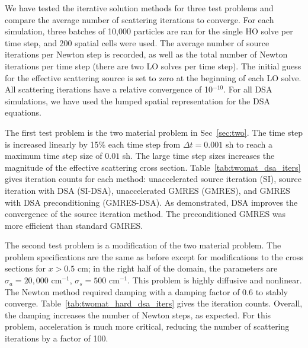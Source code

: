 {We have tested the iterative solution methods for three test problems and compare the average number
of scattering iterations to converge.   For each simulation, three batches of 10,000 particles are ran for 
the single  HO solve per time step, and 200 spatial cells were used.   The average number of source iterations per
Newton step is recorded, as well as the total number of Newton
iterations per time step (there are two LO solves per time step).  The initial guess for
the effective scattering source is set to zero at the beginning of
each LO solve.   All
scattering iterations have a relative convergence of 10$^{-10}$.
For all DSA simulations, we have used the lumped spatial representation for the DSA
equations.

The first test problem is the two material
problem in Sec~\ref{sec:two}.     The time step is increased linearly by 15\% each time step from $\Delta
t=0.001$ sh to reach a maximum time step size of $0.01$ sh.  The large time step sizes
increases the magnitude of the effective scattering cross section.
Table~\ref{tab:twomat_dsa_iters} gives iteration counts for each method: unaccelerated
source iteration (SI), source iteration with DSA (SI-DSA), unaccelerated GMRES (GMRES),
and GMRES with DSA preconditioning (GMRES-DSA).  As demonstrated, DSA improves the
convergence of the source iteration method.  The preconditioned GMRES was more efficient
than standard GMRES.

The second test problem is a modification of the two material problem. The problem
specifications are the same as before except for modifications to the cross sections for
$x>0.5$ cm; in the right half of the domain, the
parameters are $\sigma_a = 20,000$ cm$^{-1}$, $\sigma_s=500 $ cm$^{-1}$.  This problem is
highly diffusive and nonlinear. The Newton method required damping with a damping factor of $0.6$ to
stably converge.  Table~\ref{tab:twomat_hard_dsa_iters} gives the iteration counts.
Overall, the damping increases the number of Newton steps, as expected. For this problem,
acceleration is much more critical, reducing the number of scattering iterations by a
factor of 100.  

}
